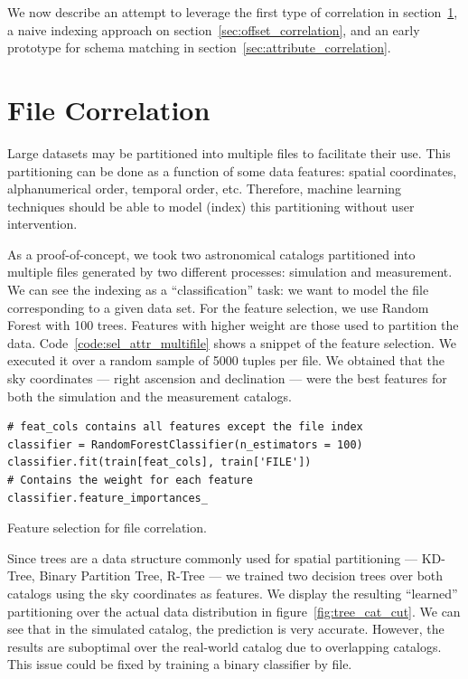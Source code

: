 We now describe an attempt to leverage the first type of correlation in
section~\ref{sec:file_correlation}, a naive indexing approach on section~\ref{sec:offset_correlation},
and an early prototype for schema matching in section~\ref{sec:attribute_correlation}.

\section{File Correlation}
\label{sec:file_correlation}

Large datasets may be partitioned into multiple files to facilitate their use.
This partitioning can be done as a function of some data features: spatial coordinates,
alphanumerical order, temporal order, etc. Therefore, machine learning techniques
should be able to model (index) this partitioning without user intervention.

As a proof-of-concept, we took two astronomical catalogs partitioned into multiple
files generated by two different processes: simulation and measurement.
We can see the indexing as a ``classification'' task: we want to model the file
corresponding to a given data set. For the feature selection, we use Random Forest
with 100 trees. Features with higher weight are those used to partition the data.
Code~\ref{code:sel_attr_multifile} shows a snippet of the feature selection.
We executed it over a random sample of 5000 tuples per file.
We obtained that the sky coordinates --- right ascension and declination --- were
the best features for both the simulation and the measurement catalogs.

\begin{listing}[H]
\begin{verbatim}
# feat_cols contains all features except the file index
classifier = RandomForestClassifier(n_estimators = 100)
classifier.fit(train[feat_cols], train['FILE'])
# Contains the weight for each feature
classifier.feature_importances_
\end{verbatim}
\caption{Feature selection for file correlation.}
\label{code:sel_attr_multifile}
\end{listing}

Since trees are a data structure commonly used for spatial partitioning
--- KD-Tree, Binary Partition Tree, R-Tree --- we trained two decision trees over
both catalogs using the sky coordinates as features.
We display the resulting ``learned'' partitioning over the actual data distribution
in figure~\ref{fig:tree_cat_cut}.
We can see that in the simulated catalog, the prediction is very accurate.
However, the results are suboptimal over the real-world catalog due to overlapping catalogs.
This issue could be fixed by training a binary classifier by file.

